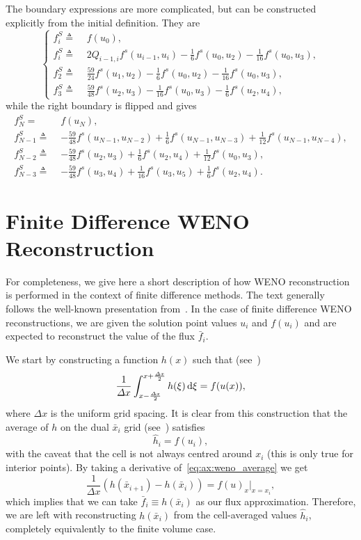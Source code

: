 \documentclass{scrartcl}
\begin{document}
The boundary expressions are more complicated, but can be constructed
explicitly from the initial definition. They are
\[
\left\{
\begin{aligned}
f^S_i \triangleq \,\, & f(u_0), \\
f^S_i \triangleq \,\, &
    2 Q_{i - 1, i} f^s(u_{i - 1}, u_i)
    - \frac{1}{6} f^s(u_0, u_2)
    - \frac{1}{16} f^s(u_0, u_3), \\
f^S_2 \triangleq \,\, &
\frac{59}{24} f^s(u_1, u_2)
- \frac{1}{6} f^s(u_0, u_2)
- \frac{1}{16} f^s(u_0, u_3), \\
f^S_3 \triangleq \,\, &
\frac{59}{48} f^s(u_2, u_3)
- \frac{1}{16} f^s(u_0, u_3)
- \frac{1}{6} f^s(u_2, u_4),
\end{aligned}
\right.
\]
while the right boundary is flipped and gives
\[
\begin{aligned}
f^S_N = \,\, & f(u_N), \\
f^S_{N - 1} \triangleq \,\, &
    -\frac{59}{48} f^s(u_{N - 1}, u_{N - 2})
    + \frac{1}{6} f^s(u_{N - 1}, u_{N - 3})
    + \frac{1}{12} f^s(u_{N - 1}, u_{N - 4}), \\
f^S_{N - 2} \triangleq \,\, &
    -\frac{59}{48} f^s(u_2, u_3)
    + \frac{1}{6} f^s(u_2, u_4)
    + \frac{1}{12} f^s(u_0, u_3), \\
f^S_{N - 3} \triangleq \,\, &
    -\frac{59}{48} f^s(u_3, u_4)
    + \frac{1}{16} f^s(u_3, u_5)
    + \frac{1}{6} f^s(u_2, u_4).
\end{aligned}
\]


\appendix
\section{Finite Difference WENO Reconstruction} %
\label{ax:weno}

For completeness, we give here a short description of how WENO reconstruction is
performed in the context of finite difference methods. The text generally
follows the well-known presentation from~\cite{Shu2009}. In the case of finite
difference WENO reconstructions, we are given the solution point values $u_i$ and
$f(u_i)$ and are expected to reconstruct the value of the flux $\bar{f}_i$.

We start by constructing a function $h(x)$ such that (see~\cite[Section 3.2]{Shu2009})
\begin{equation} \label{eq:ax:weno_average}
\frac{1}{\Delta x} \int_{x - \frac{\Delta x}{2}}^{x + \frac{\Delta x}{2}}
    h(\xi) \dx[\xi] = f(u(x)),
\end{equation}
where $\Delta x$ is the uniform grid spacing. It is clear from this construction
that the average of $h$ on the dual $\bar{x}_i$ grid (see~) satisfies
\[
\hat{h}_i = f(u_i),
\]
with the caveat that the cell is not always centred around $x_i$ (this is only
true for interior points). By taking a derivative of~\eqref{eq:ax:weno_average}
we get
\[
\frac{1}{\Delta x} (h(\bar{x}_{i + 1}) - h(\bar{x}_i)) = f(u)_x\Big|_{x = x_i},
\]
which implies that we can take $\bar{f}_i \equiv h(\bar{x}_i)$ as our flux
approximation. Therefore, we are left with reconstructing $h(\bar{x}_i)$ from
the cell-averaged values $\hat{h}_i$, completely equivalently to the finite
volume case.
\end{document}
